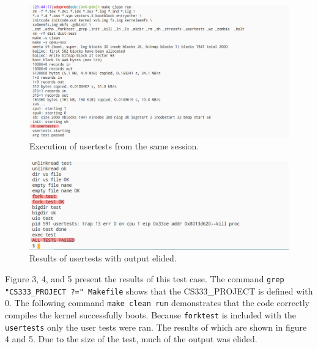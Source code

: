 \documentclass[11pt,letterpaper]{report}
\newcommand{\code}[1]{\colorbox{codegray}{\texttt{#1}}}
\begin{document}
{  \begin{figure}[h!]
	\centering
	\includegraphics[width=1\linewidth]{test3-cont2.png}
	\caption[PRINT\_SYSCALLS=0]{Execution of usertests from the same session.}
	\label{fig:P1compileP0-1}
  \end{figure}

  \begin{figure}[h!]
	\centering
	\includegraphics[width=1\linewidth]{test3-cont.png}
	\caption[PRINT\_SYSCALLS=0]{Results of usertests with output elided.}
	\label{fig:P1compileP0-1}
  \end{figure}
  
  Figure 3, 4, and 5 present the results of this test case. The command \code{grep "CS333\_PROJECT ?=" Makefile}
  shows that the CS333\_PROJECT is defined with 0. The following command \code{make clean run} demonstrates that 
  the code correctly compiles the kernel successfully boots. Because \code{forktest} is included with the \code{usertests}
  only the user tests were ran. The results of which are shown in figure 4 and 5. Due to the size of the test, much of the 
  output was elided. 
  
\pagebreak
  
\ifdefined \LF
} %
\fi
\end{document}
